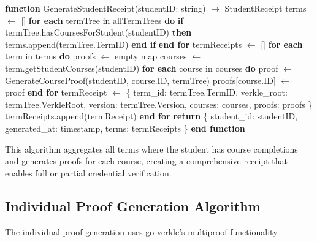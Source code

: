\begin{algorithm}[H]
\caption{GenerateStudentReceipt - Create Complete Receipt}
\label{alg:generate-receipt}
\begin{algorithmic}[1]
\STATE \textbf{function} GenerateStudentReceipt(studentID: string) $\rightarrow$ StudentReceipt
\STATE \quad terms $\leftarrow$ []
\STATE
\STATE \quad \textbf{for each} termTree in allTermTrees \textbf{do}
\STATE \quad \quad \textbf{if} termTree.hasCoursesForStudent(studentID) \textbf{then}
\STATE \quad \quad \quad terms.append(termTree.TermID)
\STATE \quad \quad \textbf{end if}
\STATE \quad \textbf{end for}
\STATE
\STATE \quad termReceipts $\leftarrow$ []
\STATE \quad \textbf{for each} term in terms \textbf{do}
\STATE \quad \quad proofs $\leftarrow$ empty map
\STATE \quad \quad courses $\leftarrow$ term.getStudentCourses(studentID)
\STATE
\STATE \quad \quad \textbf{for each} course in courses \textbf{do}
\STATE \quad \quad \quad proof $\leftarrow$ GenerateCourseProof(studentID, course.ID, termTree)
\STATE \quad \quad \quad proofs[course.ID] $\leftarrow$ proof
\STATE \quad \quad \textbf{end for}
\STATE
\STATE \quad \quad termReceipt $\leftarrow$ \{
\STATE \quad \quad \quad term\_id: termTree.TermID,
\STATE \quad \quad \quad verkle\_root: termTree.VerkleRoot,
\STATE \quad \quad \quad version: termTree.Version,
\STATE \quad \quad \quad courses: courses,
\STATE \quad \quad \quad proofs: proofs
\STATE \quad \quad \}
\STATE \quad \quad termReceipts.append(termReceipt)
\STATE \quad \textbf{end for}
\STATE
\STATE \quad \textbf{return} \{
\STATE \quad \quad student\_id: studentID,
\STATE \quad \quad generated\_at: timestamp,
\STATE \quad \quad terms: termReceipts
\STATE \quad \}
\STATE \textbf{end function}
\end{algorithmic}
\end{algorithm}

This algorithm aggregates all terms where the student has course completions and generates proofs for each course, creating a comprehensive receipt that enables full or partial credential verification.

\subsection{Individual Proof Generation Algorithm}
\label{subsec:proof-gen-algo}

The individual proof generation uses go-verkle's multiproof functionality.

